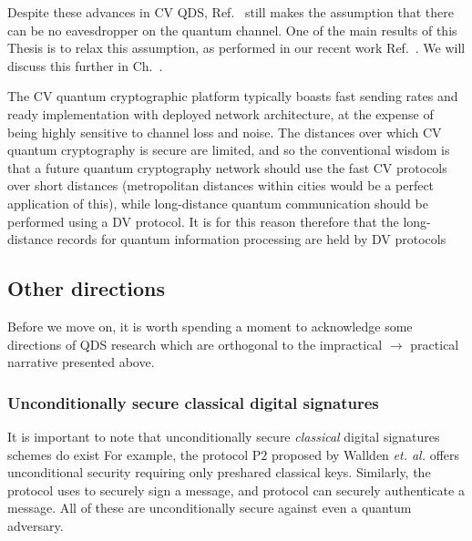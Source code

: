 Despite these advances in CV QDS, Ref.~\cite{Croal2016} still makes the assumption that there can be no eavesdropper on the quantum channel. One of the main results of this Thesis is to relax this assumption, as performed in our recent work Ref.~\cite{Thornton2019}. We will discuss this further in Ch.~.

The CV quantum cryptographic platform typically boasts fast sending rates and ready implementation with deployed network architecture, at the expense of being highly sensitive to channel loss and noise. The distances over which CV quantum cryptography is secure are limited, and so the conventional wisdom is that a future quantum cryptography network should use the fast CV protocols over short distances (metropolitan distances within cities would be a perfect application of this), while long-distance quantum communication should be performed using a DV protocol. It is for this reason therefore that the long-distance records for quantum information processing are held by DV protocols 



\subsection*{Other directions}


%
%

Before we move on, it is worth spending a moment to acknowledge some directions of QDS research which are orthogonal to the impractical $\rightarrow$ practical narrative presented above.


\subsubsection*{Unconditionally secure classical digital signatures}
It is important to note that unconditionally secure \emph{classical} digital signatures schemes do exist  For example, the protocol P$2$ proposed by Wallden \emph{et. al.} \cite{Wallden2015} offers unconditional security requiring only preshared classical keys. Similarly, the protocol \cite{Amiri2016a} uses  to securely sign a message, and protocol  can securely authenticate  a message. All of these are unconditionally secure against even a quantum adversary.

